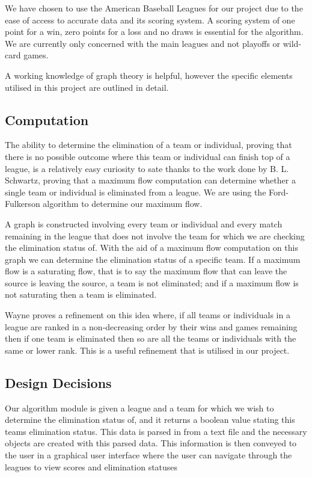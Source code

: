 \documentclass{report}
\begin{document}
We have chosen to use the American Baseball Leagues for our project due to the ease of access to accurate data and its scoring system. A scoring system of one point for a win, zero points for a loss and no draws is essential for the algorithm. We are currently only concerned with the main leagues and not playoffs or wild-card games.

A working knowledge of graph theory is helpful, however the specific elements utilised in this project are outlined in detail. 

\subsection*{Computation}

The ability to determine the elimination of a team or individual, proving that there is no possible outcome where this team or individual can finish top of a league, is a relatively easy curiosity to sate thanks to the work done by B. L. Schwartz\cite{Schwartz}, proving that a maximum flow computation can determine whether a single team or individual is eliminated from a league. We are using the Ford-Fulkerson algorithm to determine our maximum flow. 

A graph is constructed involving every team or individual and every match remaining in the league that does not involve the team for which we are checking the elimination status of. With the aid of a maximum flow computation on this graph we can determine the elimination status of a specific team. If a maximum flow is a saturating flow, that is to say the maximum flow that can leave the source is leaving the source, a team is not eliminated; and if a maximum flow is not saturating then a team is eliminated.

Wayne \cite{Wayne} proves a refinement on this idea where, if all teams or individuals in a league are ranked in a non-decreasing order by their wins and games remaining then if one team is eliminated then so are all the teams or individuals with the same or lower rank. This is a useful refinement that is utilised in our project. 

\subsection*{Design Decisions}

Our algorithm module is given a league and a team for which we wish to determine the elimination status of, and it returns a boolean value stating this teams elimination status. This data is parsed in from a text file and the necessary objects are created with this parsed data. This information is then conveyed to the user in a graphical user interface where the user can navigate through the leagues to view scores and elimination statuses
\end{document}
